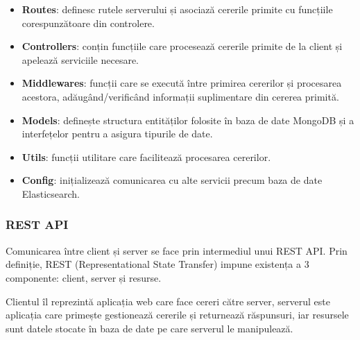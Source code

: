 \begin{itemize}
    \item \textbf{Routes}: definesc rutele serverului și asociază cererile primite cu funcțiile
    corespunzătoare din controlere.
    \item \textbf{Controllers}: conțin funcțiile care procesează cererile primite de la client
    și apelează serviciile necesare.
    \item \textbf{Middlewares}: funcții care se execută între primirea cererilor și procesarea
    acestora, adăugând/verificând informații suplimentare din cererea primită.
    \item \textbf{Models}: definește structura entităților folosite în baza de date MongoDB 
    și a interfețelor pentru a asigura tipurile de date.
    \item \textbf{Utils}: funcții utilitare care facilitează procesarea cererilor.
    \item \textbf{Config}: inițializează comunicarea cu alte servicii precum baza de date Elasticsearch.
\end{itemize}

\subsubsection{REST API}
Comunicarea între client și server se face prin intermediul unui REST API. Prin definiție,
REST (Representational State Transfer) impune existența a 3 componente: client, server și resurse.
\par
Clientul îl reprezintă aplicația web care face cereri către server, serverul este aplicația
care primește gestionează cererile și returnează răspunsuri, iar resursele sunt datele stocate
în baza de date pe care serverul le manipulează.

